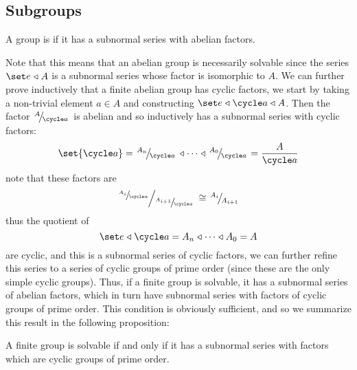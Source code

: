 \documentclass[10pt]{article}
\def\slfrac#1#2{\left.{}^{#1}\mkern-4mu\middle/\mkern-3mu{}_{#2}\right.}
\def\normal{\mathrel\triangleleft}
\begin{document}


\bigskip

\subsection{Subgroups}

\begin{defn*}

    A group is  if it has a subnormal series with abelian factors.

\end{defn*}

Note that this means that an abelian group is necessarily solvable since the series $\set e\normal A$ is a subnormal series whose factor is isomorphic to $A$.
We can further prove inductively that a finite abelian group has cyclic factors, we start by taking a non-trivial element $a\in A$ and constructing $\set e\normal\cycle a\normal A$.
Then the factor $\slfrac A{\cycle a}$ is abelian and so inductively has a subnormal series with cyclic factors:
\[ \set{\cycle a} = \slfrac{A_n}{\cycle a} \normal \cdots \normal \slfrac{A_0}{\cycle a} = \frac{A}{\cycle a} \]
note that these factors are
\[ \slfrac{\slfrac{A_i}{\cycle a}}{\slfrac{A_{i+1}}{\cycle a}} \cong \slfrac{A_i}{A_{i+1}} \]
thus the quotient of 
\[ \set e \normal \cycle a = A_n \normal \cdots \normal A_0 = A \]
are cyclic, and this is a subnormal series of cyclic factors, we can further refine this series to a series of cyclic groups of prime order (since these are the only simple cyclic groups).
Thus, if a finite group is solvable, it has a subnormal series of abelian factors, which in turn have subnormal series with factors of cyclic groups of prime order.
This condition is obviously sufficient, and so we summarize this result in the following proposition:

\begin{prop*}

    A finite group is solvable if and only if it has a subnormal series with factors which are cyclic groups of prime order.

\end{prop*}
\end{document}
